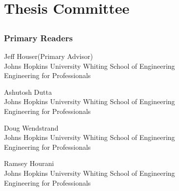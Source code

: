 \chapter*{Thesis Committee}

\section*{}
\subsection*{Primary Readers}

\begin{singlespace}


\indent Jeff Houser(Primary Advisor)\\
\indent \indent Johns Hopkins University Whiting School of Engineering\\
\indent \indent  Engineering for Professionals\\


\smallskip

\noindent Ashutosh Dutta\\
\indent \indent Johns Hopkins University Whiting School of Engineering\\
\indent \indent  Engineering for Professionals\\

\smallskip

\noindent Doug Wendstrand\\
\indent \indent Johns Hopkins University Whiting School of Engineering\\
\indent \indent  Engineering for Professionals\\

\smallskip

\noindent Ramsey Hourani\\
\indent \indent Johns Hopkins University Whiting School of Engineering\\
\indent \indent  Engineering for Professionals\\

\end{singlespace}

